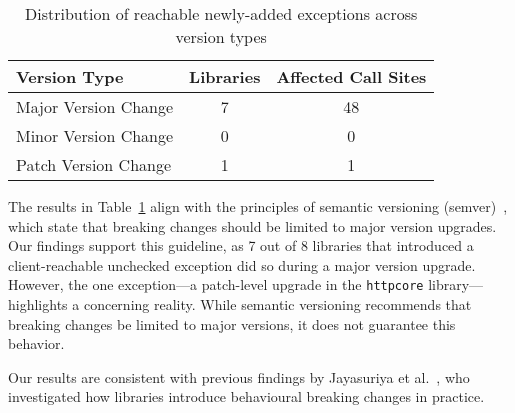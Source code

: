 \begin{table}[h]
\centering
\caption{Distribution of reachable newly-added exceptions across version types}
\label{tab:version-distribution}
\begin{tabular}{lcc}
\toprule
\textbf{Version Type} & \textbf{Libraries} & \textbf{Affected Call Sites} \\
\midrule
Major Version Change & 7 & 48 \\
Minor Version Change & 0 & 0 \\
Patch Version Change & 1 & 1 \\
\bottomrule
\end{tabular}
\end{table}

The results in Table~\ref{tab:version-distribution} align with the principles of semantic versioning (semver)~\cite{preston-werner23:_seman_version}, which state that breaking changes should be limited to major version upgrades. Our findings support this guideline, as 7 out of 8 libraries that introduced a client-reachable unchecked exception did so during a major version upgrade. However, the one exception—a patch-level upgrade in the \texttt{httpcore} library—highlights a concerning reality. While semantic versioning recommends that breaking changes be limited to major versions, it does not guarantee this behavior.

Our results are consistent with previous findings by Jayasuriya et al.~\cite{jayasuriya23:_under_break_chang_wild,jayasuriya24}, who investigated how libraries introduce behavioural breaking changes in practice.

